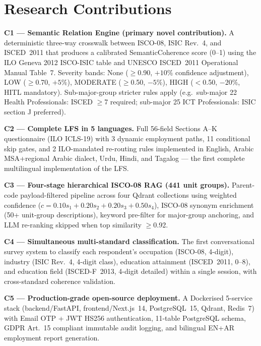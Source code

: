 \section{Research Contributions}
\label{sec:contributions}

\noindent\textbf{C1 --- Semantic Relation Engine (primary novel contribution).}
A deterministic three-way crosswalk between ISCO-08, ISIC Rev.~4, and
ISCED~2011 that produces a calibrated SemanticCoherence score (0--1)
using the ILO Geneva 2012 ISCO-ISIC table and UNESCO ISCED~2011 Operational
Manual Table~7.
Severity bands: None ($\geq$0.90, $+10\%$ confidence adjustment), LOW
($\geq$0.70, $+5\%$), MODERATE ($\geq$0.50, $-5\%$), HIGH ($<$0.50, $-20\%$,
HITL mandatory).
Sub-major-group stricter rules apply (e.g.\ sub-major 22 Health Professionals:
ISCED $\geq$7 required; sub-major 25 ICT Professionals: ISIC section J
preferred).

\noindent\textbf{C2 --- Complete LFS in 5 languages.}
Full 56-field Sections A--K questionnaire (ILO ICLS-19) with 3 dynamic
employment paths, 11 conditional skip gates, and 2 ILO-mandated re-routing
rules implemented in English, Arabic MSA+regional Arabic dialect, Urdu, Hindi, and
Tagalog --- the first complete multilingual implementation of the LFS.

\noindent\textbf{C3 --- Four-stage hierarchical ISCO-08 RAG (441 unit groups).}
Parent-code payload-filtered pipeline across four Qdrant collections using
weighted confidence ($c = 0.10s_1 + 0.20s_2 + 0.20s_3 + 0.50s_4$),
ISCO-08 synonym enrichment (50+ unit-group descriptions), keyword pre-filter
for major-group anchoring, and LLM re-ranking skipped when top similarity
$\geq$0.92.

\noindent\textbf{C4 --- Simultaneous multi-standard classification.}
The first conversational survey system to classify each respondent's occupation
(ISCO-08, 4-digit), industry (ISIC Rev.~4, 4-digit class), education attainment
(ISCED~2011, 0--8), and education field (ISCED-F~2013, 4-digit detailed) within
a single session, with cross-standard coherence validation.

\noindent\textbf{C5 --- Production-grade open-source deployment.}
A Dockerised 5-service stack (backend/FastAPI, frontend/Next.js~14, PostgreSQL~15,
Qdrant, Redis~7) with Email OTP + JWT HS256 authentication, 11-table PostgreSQL
schema, GDPR Art.~15 compliant immutable audit logging, and bilingual EN+AR
employment report generation.

